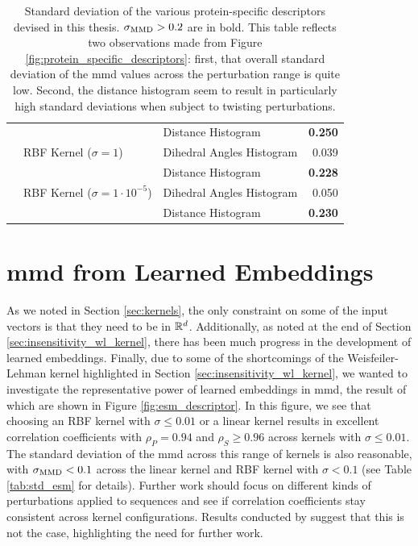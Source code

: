\begin{table}
{\begin{tabular}{lllr}
                    &             & Distance Histogram &           \textbf{0.250} \\
                    & RBF Kernel ($\sigma=1$) & Dihedral Angles Histogram &           0.039 \\
                    &             & Distance Histogram &           \textbf{0.228} \\
                    & RBF Kernel ($\sigma=1\cdot 10^{-5}$) & Dihedral Angles Histogram &           0.050 \\
                    &             & Distance Histogram &           \textbf{0.230} \\
      \bottomrule
    \end{tabular}
  }
  \caption[Standard deviation of the various protein-specific descriptors
devised in this thesis.]{Standard deviation of the various protein-specific
descriptors devised in this thesis. $\sigma_{\text{MMD}}>0.2$ are in bold. This table
reflects two observations made from Figure
\ref{fig:protein_specific_descriptors}: first, that overall standard deviation
of the \gls{mmd} values across the perturbation range is quite low. Second, the
distance histogram seem to result in particularly high standard deviations when
subject to twisting perturbations.
}
  \label{tab:protein_descriptors_std}
\end{table}

\section{\gls{mmd} from Learned Embeddings}\label{sec:results_esm}

As we noted in Section \ref{sec:kernels}, the only constraint on some of the
input vectors is that they need to be in $\mathbb{R}^d$. Additionally, as noted at the
end of Section \ref{sec:insensitivity_wl_kernel}, there has been much progress
in the development of learned embeddings. Finally, due to some of the
shortcomings of the Weisfeiler-Lehman kernel highlighted in Section
\ref{sec:insensitivity_wl_kernel}, we wanted to investigate the representative
power of learned embeddings in \gls{mmd}, the result of which are shown in Figure
\ref{fig:esm_descriptor}. In this figure, we see that choosing an RBF kernel
with $\sigma\leq 0.01$ or a linear kernel results in excellent correlation
coefficients with $\rho_P=0.94$ and $\rho_S\geq 0.96$ across kernels with
$\sigma\leq 0.01$. The standard deviation of the \gls{mmd} across this range of
kernels is also reasonable, with $\sigma_{\text{MMD}}<0.1$ across the linear kernel and
RBF kernel with $\sigma<0.1$ (see Table \ref{tab:std_esm} for details). Further
work should focus on different kinds of perturbations applied to sequences and
see if correlation coefficients stay consistent across kernel configurations.
Results conducted by \cite{kucera2022conditional} suggest that this is not the
case, highlighting the need for further work.

